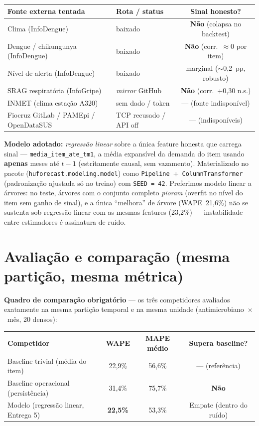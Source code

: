 \documentclass[11pt,a4paper]{article}
\newcommand{\nao}{\textbf{\textcolor{vermelhoL}{Não}}}
\begin{document}
\begin{center}
\small
\begin{tabular}{@{}llc@{}}
\toprule
\textbf{Fonte externa tentada} & \textbf{Rota / status} & \textbf{Sinal honesto?} \\
\midrule
Clima (InfoDengue) & baixado & \nao{} (colapsa no backtest) \\
Dengue / chikungunya (InfoDengue) & baixado & \nao{} (corr.\ $\approx$0 por item) \\
Nível de alerta (InfoDengue) & baixado & marginal ($\sim$0,2~pp, robusto) \\
SRAG respiratória (InfoGripe) & \emph{mirror} GitHub & \nao{} (corr.\ +0,30 n.s.) \\
INMET (clima estação A320) & sem dado / token & --- (fonte indisponível) \\
Fiocruz GitLab / PAMEpi / OpenDataSUS & TCP recusado / API off & --- (indisponíveis) \\
\bottomrule
\end{tabular}
\end{center}

\textbf{Modelo adotado:} \emph{regressão linear} sobre a única feature honesta que carrega sinal --- \texttt{media\_item\_ate\_tm1}, a média expansível da demanda do item usando \textbf{apenas} meses até $t-1$ (estritamente causal, sem vazamento). Materializado no pacote (\texttt{huforecast.modeling.model}) como \texttt{Pipeline}~+~\texttt{ColumnTransformer} (padronização ajustada só no treino) com \texttt{SEED~=~42}. Preferimos modelo linear a árvores: no teste, árvores com o conjunto completo \emph{pioram} (overfit no nível do item sem ganho de sinal), e a única ``melhora'' de árvore (WAPE~21,6\%) não se sustenta sob regressão linear com as mesmas features (23,2\%) --- instabilidade entre estimadores é assinatura de ruído.

\section{Avaliação e comparação (mesma partição, mesma métrica)}
\textbf{Quadro de comparação obrigatório} --- os três competidores avaliados exatamente na mesma partição temporal e na mesma unidade (antimicrobiano~$\times$~mês, 20 densos):

\begin{center}
\begin{tabular}{@{}lccc@{}}
\toprule
\textbf{Competidor} & \textbf{WAPE} & \textbf{MAPE médio} & \textbf{Supera baseline?} \\
\midrule
Baseline trivial (média do item) & 22,9\% & 56,6\% & --- (referência) \\
Baseline operacional (persistência) & 31,4\% & 75,7\% & \nao \\
Modelo (regressão linear, Entrega 5) & \textbf{22,5\%} & 53,3\% & Empate (dentro do ruído) \\
\bottomrule
\end{tabular}
\end{center}
\end{document}
